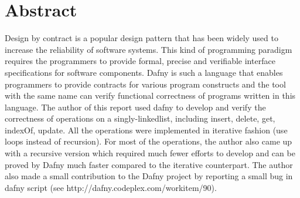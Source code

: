 \section*{Abstract}
Design by contract is a popular design pattern that has been widely used to increase the reliability of software systems. This kind of programming paradigm requires the programmers to provide formal, precise and verifiable interface specifications for software components\cite{wiki:dbc}. Dafny\cite{dafny1} is such a language that enables programmers to provide contracts for various program constructs and the tool with the same name can verify functional correctness of programs written in this language. The author of this report used dafny to develop and verify the correctness of operations on a singly-linkedlist, including insert, delete, get, indexOf, update. All the operations were implemented in iterative fashion (use loops instead of recursion). For most of the operations, the author also came up with a recursive version which required much fewer efforts to develop and can be proved by Dafny much faster compared to the iterative counterpart. The author also made a small contribution to the Dafny project by reporting a small bug in dafny script (see http://dafny.codeplex.com/workitem/90).
